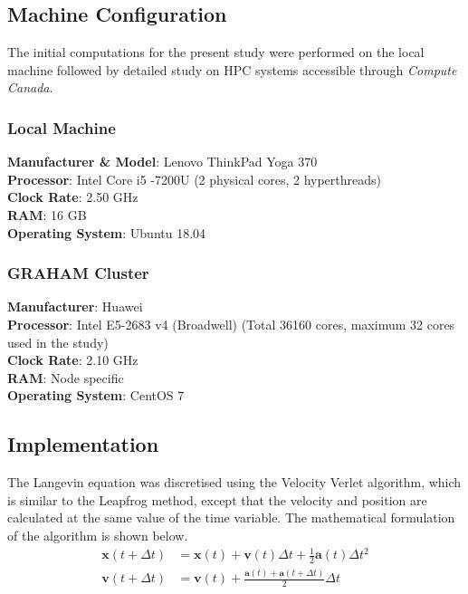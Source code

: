 \documentclass[11pt, oneside]{article}
\begin{document}
\subsection{Machine Configuration}
The initial computations for the present study were performed on the local machine followed by detailed study on HPC systems accessible through \textit{Compute Canada}.
      \subsubsection{Local Machine}
        \textbf{Manufacturer \& Model}: Lenovo ThinkPad Yoga 370\\
	\textbf{Processor}: Intel Core i5 -7200U (2 physical cores, 2 hyperthreads)\\
	\textbf{Clock Rate}:  2.50 GHz\\
	\textbf{RAM}:  16 GB\\
	\textbf{Operating System}: Ubuntu 18.04\\

       \subsubsection{GRAHAM Cluster}
        \textbf{Manufacturer}: Huawei\\
	\textbf{Processor}: Intel E5-2683 v4 (Broadwell) (Total 36160 cores, maximum 32 cores used in the study)\\
	\textbf{Clock Rate}:  2.10 GHz\\
	\textbf{RAM}:  Node specific\\
	\textbf{Operating System}: CentOS 7\\

	
\subsection{Implementation}
The Langevin equation was discretised using the Velocity Verlet algorithm, which is similar to the Leapfrog method, except that the velocity and position are calculated at the same value of the time variable. The mathematical formulation of the algorithm is shown below.
\begin{equation}
  \begin{split}
    \mathbf{x}(t + \Delta t) &= \mathbf{x}(t) +  \mathbf{v}(t)\Delta t + \frac{1}{2} \mathbf{a}(t) \Delta t^2 \\
    \mathbf{v}(t + \Delta t) &= \mathbf{v}(t) + \frac{\mathbf{a}(t) + \mathbf{a}(t+\Delta t)}{2} \Delta t \\
  \end{split}
\end{equation}
\end{document}
